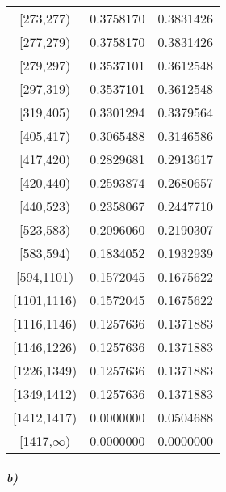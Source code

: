 \documentclass[
]{article}
\begin{document}
\begin{table}[H]
\begin{tabular}[t]{ccc}
{}[273,277) & 0.3758170 & 0.3831426\\
\addlinespace
{}[277,279) & 0.3758170 & 0.3831426\\
{}[279,297) & 0.3537101 & 0.3612548\\
{}[297,319) & 0.3537101 & 0.3612548\\
{}[319,405) & 0.3301294 & 0.3379564\\
{}[405,417) & 0.3065488 & 0.3146586\\
\addlinespace
{}[417,420) & 0.2829681 & 0.2913617\\
{}[420,440) & 0.2593874 & 0.2680657\\
{}[440,523) & 0.2358067 & 0.2447710\\
{}[523,583) & 0.2096060 & 0.2190307\\
{}[583,594) & 0.1834052 & 0.1932939\\
\addlinespace
{}[594,1101) & 0.1572045 & 0.1675622\\
{}[1101,1116) & 0.1572045 & 0.1675622\\
{}[1116,1146) & 0.1257636 & 0.1371883\\
{}[1146,1226) & 0.1257636 & 0.1371883\\
{}[1226,1349) & 0.1257636 & 0.1371883\\
\addlinespace
{}[1349,1412) & 0.1257636 & 0.1371883\\
{}[1412,1417) & 0.0000000 & 0.0504688\\
{}[1417,$\infty$) & 0.0000000 & 0.0000000\\
\bottomrule
\end{tabular}
\end{table}

\hypertarget{b-2}{%
\subparagraph{b)}\label{b-2}}

\hspace{2 pt}
\end{document}
